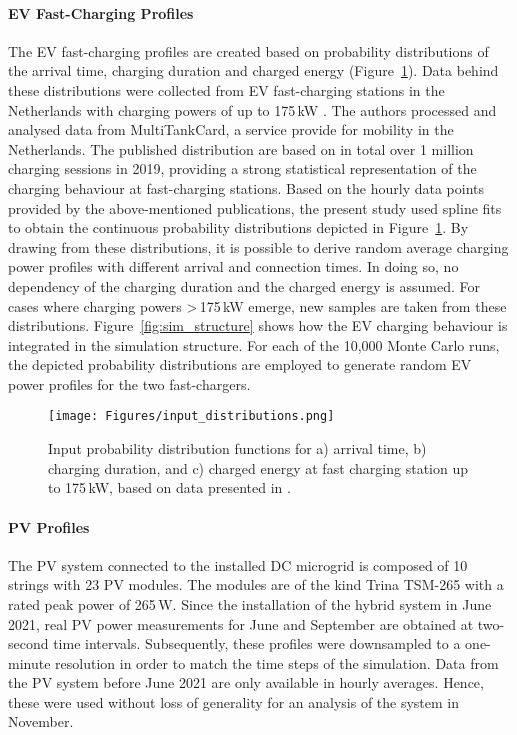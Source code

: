 \documentclass[final,5p,times,twocolumn]{elsarticle}
\begin{document}
\paragraph{EV Fast-Charging Profiles}

The EV fast-charging profiles are created based on probability distributions of the arrival time, charging duration and charged energy (Figure~\ref{fig:input_distributions}). Data behind these distributions were collected from EV fast-charging stations in the Netherlands with charging powers of up to 175\,kW \cite{Wolbertus.2019,Wolbertus.2020}. The authors processed and analysed data from MultiTankCard, a service provide for mobility in the Netherlands. The published distribution are based on in total over 1 million charging sessions in 2019, providing a strong statistical representation of the charging behaviour at fast-charging stations. Based on the hourly data points provided by the above-mentioned publications, the present study used spline fits to obtain the continuous probability distributions depicted in Figure~\ref{fig:input_distributions}. By drawing from these distributions, it is possible to derive random average charging power profiles with different arrival and connection times. In doing so, no dependency of the charging duration and the charged energy is assumed. For cases where charging powers \textgreater\,175\,kW emerge, new samples are taken from these distributions. Figure~\ref{fig:sim_structure} shows how the EV charging behaviour is integrated in the simulation structure. For each of the 10,000 Monte Carlo runs, the depicted probability distributions are employed to generate random EV power profiles for the two fast-chargers. 

\begin{figure}[h]
    \centering
    \texttt{[image: Figures/input\_distributions.png]}
    \caption{Input probability distribution functions for a) arrival time, b) charging duration, and c) charged energy at fast charging station up to 175\,kW, based on data presented in \cite{Wolbertus.2019,Wolbertus.2020}.}
    \label{fig:input_distributions}
\end{figure}

\paragraph{PV Profiles}

The PV system connected to the installed DC microgrid is composed of 10 strings with 23 PV modules. The modules are of the kind Trina TSM-265 with a rated peak power of 265\,W. Since the installation of the hybrid system in June 2021, real PV power measurements for June and September are obtained at two-second time intervals. Subsequently, these profiles were downsampled to a one-minute resolution in order to match the time steps of the simulation. Data from the PV system before June 2021 are only available in hourly averages. Hence, these were used without loss of generality for an analysis of the system in November. 
\end{document}
